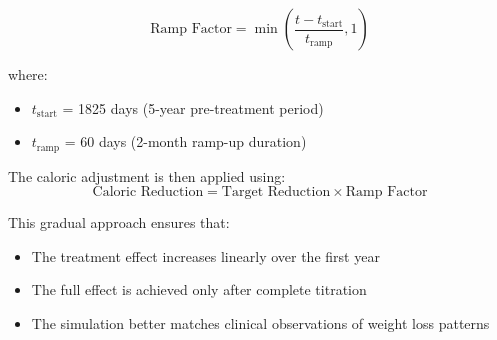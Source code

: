 \begin{equation}
    \text{Ramp Factor} = \min\left(\frac{t - t_{\text{start}}}{t_{\text{ramp}}}, 1\right)
\end{equation}

where:
\begin{itemize}
    \item $t_{\text{start}}$ = 1825 days (5-year pre-treatment period)
    \item $t_{\text{ramp}}$ = 60 days (2-month ramp-up duration)
\end{itemize}

The caloric adjustment is then applied using:
\begin{equation}
    \text{Caloric Reduction} = \text{Target Reduction} \times \text{Ramp Factor}
\end{equation}

This gradual approach ensures that:
\begin{itemize}
    \item The treatment effect increases linearly over the first year
    \item The full effect is achieved only after complete titration
    \item The simulation better matches clinical observations of weight loss patterns
\end{itemize}


